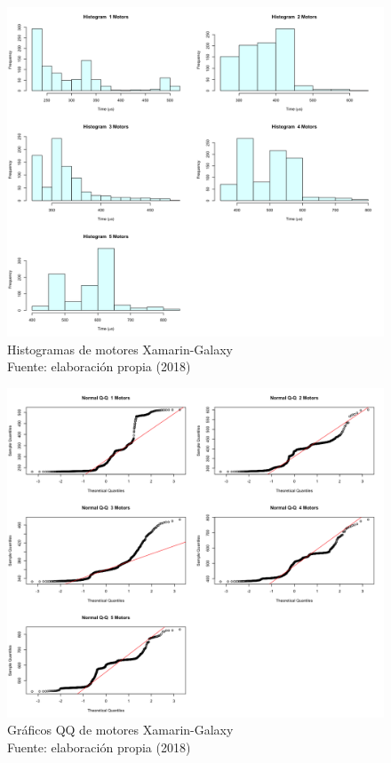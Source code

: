 \begin{figure}
 \begin{center} 
   	\includegraphics[width=1.0\textwidth]{evaluation/graphics/Xamarin/Galaxy/HistMotorsXamarinGalaxy.png} 
    \caption[Histogramas de motores Xamarin-Galaxy]{Histogramas de motores  Xamarin-Galaxy\\Fuente: elaboración propia (2018)} 
    \label{fig:xamarin-galaxy-hist-motors}
  \end{center}
\end{figure}

\begin{figure}[H]
  \begin{center} 
   	\includegraphics[width=1.0\textwidth]{evaluation/graphics/Xamarin/Galaxy/NormalQQMotorsXamarinGalaxy.png} 
    \caption[Gráfico QQ de motores Xamarin-Galaxy]{Gráficos QQ de motores Xamarin-Galaxy\\Fuente: elaboración propia (2018)} 
    \label{fig:xamarin-galaxy-QQ-motors}
  \end{center}
\end{figure}

